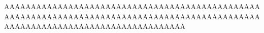 \begin{reaction}
AAAAAAAAAAAAAAAAAAAAAAAAAAAAAAAAAAAAAAAAAAAAAAAAAAAAAAAAAAAAAAAAAAAAAAAAAAAAAAAAAAAAAAAAAAAAAAAAAAAAAAAAAAAAAAAAAAAAAAAAAAAAAAAAAA
\end{reaction}
